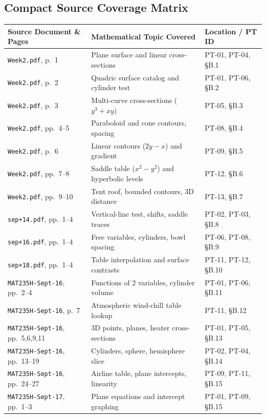 \documentclass[11pt,letterpaper]{article}
\begin{document}
\subsection{Compact Source Coverage Matrix}
\small
\begin{longtable}{p{.38\linewidth}p{.38\linewidth}p{.18\linewidth}}
\toprule
Source Document \& Pages & Mathematical Topic Covered & Location / PT ID \\
\midrule
\endhead
\texttt{Week2.pdf}, p.~1 & Plane surface and linear cross-sections & PT-01, PT-04, \S B.1 \\
\texttt{Week2.pdf}, p.~2 & Quadric surface catalog and cylinder test & PT-01, PT-06, \S B.2 \\
\texttt{Week2.pdf}, p.~3 & Multi-curve cross-sections ($y^3+xy$) & PT-05, \S B.3 \\
\texttt{Week2.pdf}, pp.~4--5 & Paraboloid and cone contours, spacing & PT-08, \S B.4 \\
\texttt{Week2.pdf}, p.~6 & Linear contours ($2y-x$) and gradient & PT-09, \S B.5 \\
\texttt{Week2.pdf}, pp.~7--8 & Saddle table ($x^2-y^2$) and hyperbolic levels & PT-12, \S B.6 \\
\texttt{Week2.pdf}, pp.~9--10 & Tent roof, bounded contours, 3D distance & PT-13, \S B.7 \\
\texttt{sep+14.pdf}, pp.~1--4 & Vertical-line test, shifts, saddle traces & PT-02, PT-03, \S B.8 \\
\texttt{sep+16.pdf}, pp.~1--4 & Free variables, cylinders, bowl spacing & PT-06, PT-08, \S B.9 \\
\texttt{sep+18.pdf}, pp.~1--4 & Table interpolation and surface contrasts & PT-11, PT-12, \S B.10 \\
\texttt{MAT235H-Sept-16}, pp.~2--4 & Functions of 2 variables, cylinder volume & PT-01, PT-06, \S B.11 \\
\texttt{MAT235H-Sept-16}, p.~7 & Atmospheric wind-chill table lookup & PT-11, \S B.12 \\
\texttt{MAT235H-Sept-16}, pp.~5,6,9,11 & 3D points, planes, heater cross-sections & PT-01, PT-05, \S B.13 \\
\texttt{MAT235H-Sept-16}, pp.~13--19 & Cylinders, sphere, hemisphere slice & PT-02, PT-04, \S B.14 \\
\texttt{MAT235H-Sept-16}, pp.~24--27 & Airline table, plane intercepts, linearity & PT-09, PT-11, \S B.15 \\
\texttt{MAT235H-Sept-17}, pp.~1--3 & Plane equations and intercept graphing & PT-01, PT-09, \S B.15 \\

\end{longtable}
\end{document}
